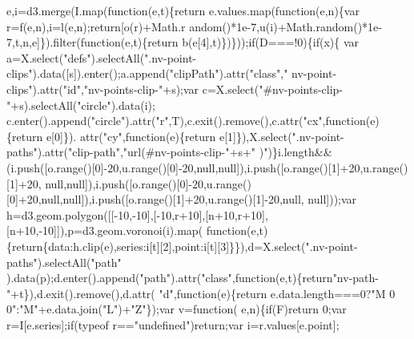 \begin{DoxyCode}
      e,i=d3.merge(I.map(\textcolor{keyword}{function}(e,t)\{return e.values.map(function(e,n)\{var r=f(e,n),i=l(e,n);return[o(r)+Math.r
      andom()*1e-7,u(i)+Math.random()*1e-7,t,n,e]\}).filter(\textcolor{keyword}{function}(e,t)\{\textcolor{keywordflow}{return} b(e[4],t)\})\}));\textcolor{keywordflow}{if}(D===!0)\{\textcolor{keywordflow}{if}(x)\{
      var a=X.select(\textcolor{stringliteral}{"defs"}).selectAll(\textcolor{stringliteral}{".nv-point-clips"}).data([s]).enter();a.append(\textcolor{stringliteral}{"clipPath"}).attr(\textcolor{stringliteral}{"class"},\textcolor{stringliteral}{"
      nv-point-clips"}).attr(\textcolor{stringliteral}{"id"},\textcolor{stringliteral}{"nv-points-clip-"}+s);var c=X.select(\textcolor{stringliteral}{"#nv-points-clip-"}+s).selectAll(\textcolor{stringliteral}{"circle"}).data(i);
      c.enter().append(\textcolor{stringliteral}{"circle"}).attr(\textcolor{stringliteral}{"r"},T),c.exit().remove(),c.attr(\textcolor{stringliteral}{"cx"},\textcolor{keyword}{function}(e)\{\textcolor{keywordflow}{return} e[0]\}).
      attr(\textcolor{stringliteral}{"cy"},\textcolor{keyword}{function}(e)\{\textcolor{keywordflow}{return} e[1]\}),X.select(\textcolor{stringliteral}{".nv-point-paths"}).attr(\textcolor{stringliteral}{"clip-path"},\textcolor{stringliteral}{"url(#nv-points-clip-"}+s+\textcolor{stringliteral}{"
      )"})\}i.length&&(i.push([o.range()[0]-20,u.range()[0]-20,null,null]),i.push([o.range()[1]+20,u.range()[1]+20,
      null,null]),i.push([o.range()[0]-20,u.range()[0]+20,null,null]),i.push([o.range()[1]+20,u.range()[1]-20,null,
      null]));var h=d3.geom.polygon([[-10,-10],[-10,r+10],[n+10,r+10],[n+10,-10]]),p=d3.geom.voronoi(i).map(\textcolor{keyword}{
      function}(e,t)\{\textcolor{keywordflow}{return}\{data:h.clip(e),series:i[t][2],point:i[t][3]\}\}),d=X.select(\textcolor{stringliteral}{".nv-point-paths"}).selectAll(\textcolor{stringliteral}{"path"}
      ).data(p);d.enter().append(\textcolor{stringliteral}{"path"}).attr(\textcolor{stringliteral}{"class"},\textcolor{keyword}{function}(e,t)\{\textcolor{keywordflow}{return}\textcolor{stringliteral}{"nv-path-"}+t\}),d.exit().remove(),d.attr(\textcolor{stringliteral}{
      "d"},\textcolor{keyword}{function}(e)\{\textcolor{keywordflow}{return} e.data.length===0?\textcolor{stringliteral}{"M 0 0"}:\textcolor{stringliteral}{"M"}+e.data.join(\textcolor{stringliteral}{"L"})+\textcolor{stringliteral}{"Z"}\});var v=\textcolor{keyword}{function}(
      e,n)\{\textcolor{keywordflow}{if}(F)\textcolor{keywordflow}{return} 0;var r=I[e.series];\textcolor{keywordflow}{if}(typeof r==\textcolor{stringliteral}{"undefined"})\textcolor{keywordflow}{return};var i=r.values[e.point];

\end{DoxyCode}
